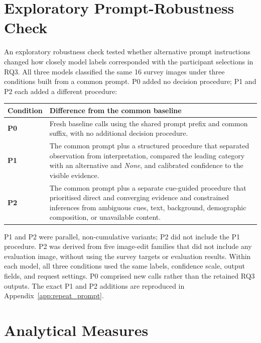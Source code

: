 \section{Exploratory Prompt-Robustness Check}
\label{sec:prompt_robustness_design}

An exploratory robustness check tested whether alternative prompt instructions
changed how closely model labels corresponded with the participant selections
in RQ3. All three models classified the same 16 survey images under three
conditions built from a common prompt. P0 added no decision procedure; P1 and
P2 each added a different procedure:

\begin{center}
\small
\begin{tabular}{@{}p{}p{}@{}}
\toprule
\textbf{Condition} & \textbf{Difference from the common baseline} \\
\midrule
\textbf{P0} & Fresh baseline calls using the shared prompt prefix and common
suffix, with no additional decision procedure. \\
\textbf{P1} & The common prompt plus a structured procedure that separated
observation from interpretation, compared the leading category with an
alternative and \textit{None}, and calibrated confidence to the visible
evidence. \\
\textbf{P2} & The common prompt plus a separate cue-guided procedure that
prioritised direct and converging evidence and constrained inferences from
ambiguous cues, text, background, demographic composition, or unavailable
content. \\
\bottomrule
\end{tabular}
\end{center}

P1 and P2 were parallel, non-cumulative variants; P2 did not include the P1
procedure. P2 was derived from five image-edit families that did not include
any evaluation image, without using the survey targets or evaluation results.
Within each model, all three conditions used the same labels, confidence scale,
output fields, and request settings. P0 comprised new calls rather than the
retained RQ3 outputs.
The exact P1 and P2 additions are reproduced in
Appendix~\ref{app:repeat_prompt}.

\section{Analytical Measures}
\label{sec:analysis}

